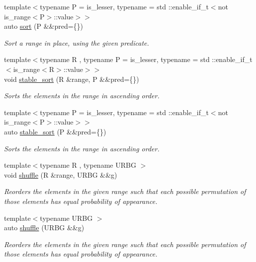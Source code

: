 \begin{DoxyCompactItemize}
{\footnotesize template$<$typename P  = is\+\_\+lesser, typename  = std \+::enable\+\_\+if\+\_\+t$<$not is\+\_\+range$<$\+P$>$\+::value$>$$>$ }\\auto \mbox{\hyperlink{namespacerah_a3a938d529ef4564281a5dca2ce49b538}{sort}} (P \&\&pred=\{\})
\begin{DoxyCompactList}\small\item\em Sort a range in place, using the given predicate. \end{DoxyCompactList}\item 
{\footnotesize template$<$typename R , typename P  = is\+\_\+lesser, typename  = std \+::enable\+\_\+if\+\_\+t$<$is\+\_\+range$<$\+R$>$\+::value$>$$>$ }\\void \mbox{\hyperlink{namespacerah_a215c9f80364af9121e2be42d1ebacdbf}{stable\+\_\+sort}} (R \&range, P \&\&pred=\{\})
\begin{DoxyCompactList}\small\item\em Sorts the elements in the range in ascending order. \end{DoxyCompactList}\item 
{\footnotesize template$<$typename P  = is\+\_\+lesser, typename  = std \+::enable\+\_\+if\+\_\+t$<$not is\+\_\+range$<$\+P$>$\+::value$>$$>$ }\\auto \mbox{\hyperlink{namespacerah_aa45a27d7e9403b82624632e1ee3daf6f}{stable\+\_\+sort}} (P \&\&pred=\{\})
\begin{DoxyCompactList}\small\item\em Sorts the elements in the range in ascending order. \end{DoxyCompactList}\item 
{\footnotesize template$<$typename R , typename U\+R\+BG $>$ }\\void \mbox{\hyperlink{namespacerah_ab1d00692710a6ee8e5b3110a56bbd59c}{shuffle}} (R \&range, U\+R\+BG \&\&g)
\begin{DoxyCompactList}\small\item\em Reorders the elements in the given range such that each possible permutation of those elements has equal probability of appearance. \end{DoxyCompactList}\item 
{\footnotesize template$<$typename U\+R\+BG $>$ }\\auto \mbox{\hyperlink{namespacerah_a93f2ab22986c011ca40816c52638e0ad}{shuffle}} (U\+R\+BG \&\&g)
\begin{DoxyCompactList}\small\item\em Reorders the elements in the given range such that each possible permutation of those elements has equal probability of appearance. \end{DoxyCompactList}\item 

\end{DoxyCompactItemize}
